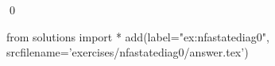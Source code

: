 
\begin{ex} 
  \label{ex:nfastatediag0}
  
  \qed
\end{ex} 
\begin{python0}
from solutions import *
add(label="ex:nfastatediag0",
    srcfilename='exercises/nfastatediag0/answer.tex') 
\end{python0}
